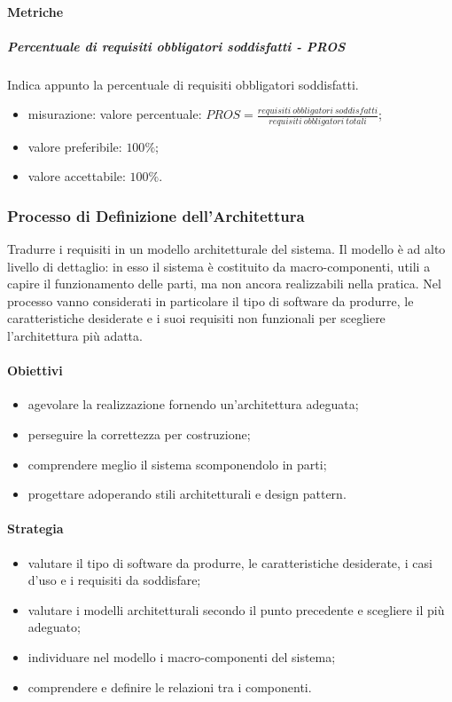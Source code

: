 		\paragraph{Metriche}
			\subparagraph{Percentuale di requisiti obbligatori soddisfatti - PROS} Indica appunto la percentuale di requisiti obbligatori soddisfatti.
			\begin{itemize}
				\item misurazione: valore percentuale: $ PROS = \frac{requisiti\ obbligatori\ soddisfatti}{requisiti\ obbligatori\ totali}$;
				\item valore preferibile: $100\%$;
				\item valore accettabile: $100\%$.
			\end{itemize}
		
	\subsubsection{Processo di Definizione dell'Architettura}
	Tradurre i requisiti in un modello architetturale del sistema.
	Il modello è ad alto livello di dettaglio: in esso il sistema è costituito da macro-componenti, utili a capire il funzionamento delle parti, ma non ancora realizzabili nella pratica.\newline
	Nel processo vanno considerati in particolare il tipo di software da produrre, le caratteristiche desiderate e i suoi requisiti non funzionali per scegliere l'architettura più adatta.
		\paragraph{Obiettivi}
		\begin{itemize}
			\item agevolare la realizzazione fornendo un'architettura adeguata;
			\item perseguire la correttezza per costruzione;
			\item comprendere meglio il sistema scomponendolo in parti;
			\item progettare adoperando stili architetturali e design pattern.
		\end{itemize}
		\paragraph{Strategia}
		\begin{itemize}
			\item valutare il tipo di software da produrre, le caratteristiche desiderate, i casi d'uso e i requisiti da soddisfare;
			\item valutare i modelli architetturali secondo il punto precedente e scegliere il più adeguato;
			\item individuare nel modello i macro-componenti del sistema;
			\item comprendere e definire le relazioni tra i componenti.
		\end{itemize}
